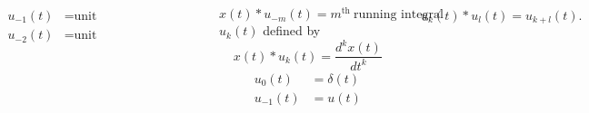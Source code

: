 \begin{frame}

    {
        \begin{columns}
                \begin{align*}
                    u_{-1}(t) &= \text{unit step}\\
                    u_{-2}(t) &= \text{unit ramp}
                \end{align*}
                \begin{figure}
                    \centering
                    
                \end{figure}
                \begin{equation*}
                    x(t)\ast u_{-m}(t) = m^\mathrm{th}~ \text{running integral}
                \end{equation*}
                $u_k(t)$ defined by
                \begin{equation*}
                    x(t)\ast u_k(t) = \frac{d^kx(t)}{dt^k}
                \end{equation*}
                \begin{align*}
                    u_0(t) &= \delta(t)\\
                    u_{-1}(t) &= u(t)
                \end{align*}

                \begin{align*}
                    u_k(t)\ast u_l(t) = u_{k+l}(t).
                \end{align*}
        \end{columns}
    }
\end{frame}

